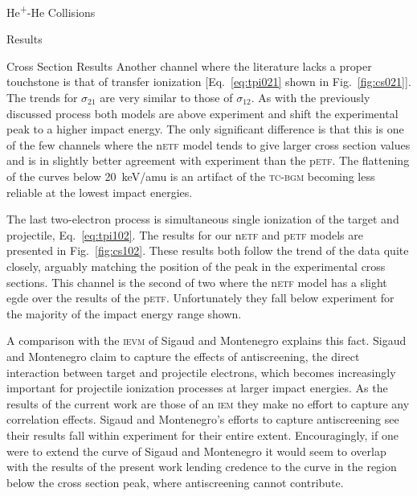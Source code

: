 \documentclass[letterpaper, 11 pt]{report}
\begin{document}
\begin{chapter}{\texorpdfstring{He\textsuperscript{+}}{He+}-He Collisions \label{chap:hephe}}
\begin{section}{Results \label{sec:hephe-disc}}
\begin{subsection}{Cross Section Results \label{sec:hephe-res}}
         Another channel where the literature lacks a proper touchstone is that of transfer ionization
         [Eq.~\eqref{eq:tpi021} shown in Fig.~\ref{fig:cs021}]. The trends for $\sigma_{21}$ are very
         similar to those of $\sigma_{12}$. As with the previously discussed process both models are
         above experiment and shift the experimental peak to a higher impact energy. The only
         significant difference is that this is one of the few channels where the n\textsc{etf} model
         tends to give larger cross section values and is in slightly better agreement with experiment
         than the p\textsc{etf}. The flattening of the curves below 20~keV/amu is an artifact of the
         \textsc{tc-bgm} becoming less reliable at the lowest impact energies.

         The last two-electron process is simultaneous single ionization of the target and projectile,
         Eq.~\eqref{eq:tpi102}. The results for our n\textsc{etf} and p\textsc{etf} models are presented
         in Fig.~\ref{fig:cs102}. These results both follow the trend of the data quite closely,
         arguably matching the position of the peak in the experimental cross sections. This channel is
         the second of two where the n\textsc{etf} model has a slight egde over the results of the
         p\textsc{etf}. Unfortunately they fall below experiment for the majority of the impact energy
         range shown.

         A comparison with the \textsc{ievm} of Sigaud and Montenegro explains this fact. Sigaud and
         Montenegro claim to capture the effects of antiscreening, the direct interaction between target
         and projectile electrons, which becomes increasingly important for projectile ionization
         processes at larger impact energies. As the results of the current work are those of an
         \textsc{iem} they make no effort to capture any correlation effects. Sigaud and Montenegro's
         efforts to capture antiscreening see their results fall within experiment for their entire
         extent. Encouragingly, if one were to extend the curve of Sigaud and Montenegro it would seem
         to overlap with the results of the present work lending credence to the curve in the region
         below the cross section peak, where antiscreening cannot contribute.


\end{subsection}
\end{section}
\end{chapter}
\end{document}
